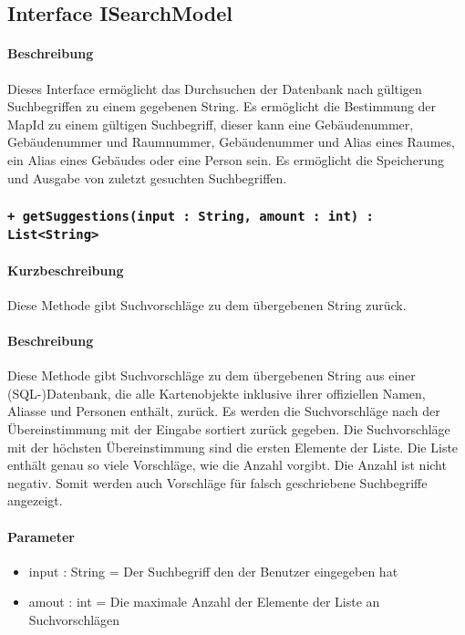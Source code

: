 \subsection{Interface ISearchModel}
\paragraph*{Beschreibung}
Dieses Interface ermöglicht das Durchsuchen der Datenbank nach gültigen Suchbegriffen zu einem gegebenen String.
Es ermöglicht die Bestimmung der MapId zu einem gültigen Suchbegriff, 
dieser kann eine Gebäudenummer, Gebäudenummer und Raumnummer, Gebäudenummer und Alias eines Raumes, ein Alias eines Gebäudes oder eine Person sein.
Es ermöglicht die Speicherung und Ausgabe von zuletzt gesuchten Suchbegriffen.

\subsubsection{\texttt{+ getSuggestions(input : String, amount : int) : List<String>}}%
\paragraph*{Kurzbeschreibung}
Diese Methode gibt Suchvorschläge zu dem übergebenen String zurück.
\paragraph*{Beschreibung}
Diese Methode gibt Suchvorschläge zu dem übergebenen String aus einer (SQL-)Datenbank, 
die alle Kartenobjekte inklusive ihrer offiziellen Namen, Aliasse und Personen enthält, zurück.
Es werden die Suchvorschläge nach der Übereinstimmung mit der Eingabe sortiert zurück gegeben.
Die Suchvorschläge mit der höchsten Übereinstimmung sind die ersten Elemente der Liste.
Die Liste enthält genau so viele Vorschläge, wie die Anzahl vorgibt. Die Anzahl ist nicht negativ.
Somit werden auch Vorschläge für falsch geschriebene Suchbegriffe angezeigt.
\paragraph*{Parameter}
\begin{itemize}
    \item input : String = Der Suchbegriff den der Benutzer eingegeben hat
    \item amout : int = Die maximale Anzahl der Elemente der Liste an Suchvorschlägen
\end{itemize}

